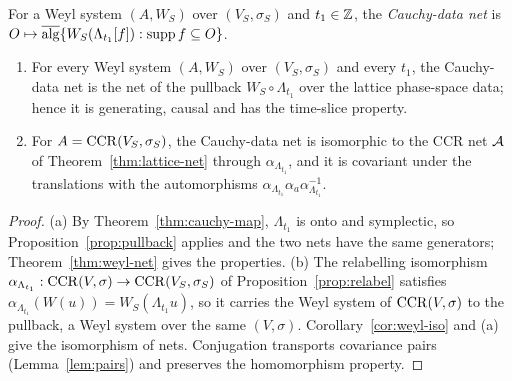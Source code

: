 \begin{definition}\label{def:cauchy-net}
For a Weyl system $(A,W_S)$ over $(V_S,\sigma_S)$ and $t_1\in\mathbb Z$, the \emph{Cauchy-data net} is
$O\mapsto\overline{\operatorname{alg}}\{W_S(\Lambda_{t_1}[f]):\operatorname{supp} f\subseteq O\}$.
\end{definition}

\begin{theorem}\label{thm:cauchy-net}
\begin{enumerate}[label=(\alph*),leftmargin=2.5em]
\item For every Weyl system $(A,W_S)$ over $(V_S,\sigma_S)$ and every $t_1$, the Cauchy-data net
is the net of the pullback $W_S\circ\Lambda_{t_1}$ over the lattice phase-space data; hence it is
generating, causal and has the time-slice property.
\item For $A=\operatorname{CCR}(V_S,\sigma_S)$, the Cauchy-data net is isomorphic to the CCR net $\mathcal A$ of
Theorem~\ref{thm:lattice-net} through $\alpha_{\Lambda_{t_1}}$, and it is covariant under the
translations with the automorphisms $\alpha_{\Lambda_{t_1}}\alpha_a\alpha_{\Lambda_{t_1}}^{-1}$.
\end{enumerate}
\end{theorem}
\begin{proof}
(a) By Theorem~\ref{thm:cauchy-map}, $\Lambda_{t_1}$ is onto and symplectic, so
Proposition~\ref{prop:pullback} applies and the two nets have the same generators;
Theorem~\ref{thm:weyl-net} gives the properties. (b) The relabelling isomorphism
$\alpha_{\Lambda_{t_1}}:\operatorname{CCR}(V,\sigma)\to\operatorname{CCR}(V_S,\sigma_S)$ of Proposition~\ref{prop:relabel}
satisfies $\alpha_{\Lambda_{t_1}}(W(u))=W_S(\Lambda_{t_1}u)$, so it carries the Weyl system of
$\operatorname{CCR}(V,\sigma)$ to the pullback, a Weyl system over the same $(V,\sigma)$.
Corollary~\ref{cor:weyl-iso} and (a) give the isomorphism of nets. Conjugation transports
covariance pairs (Lemma~\ref{lem:pairs}) and preserves the homomorphism
property.
\end{proof}

